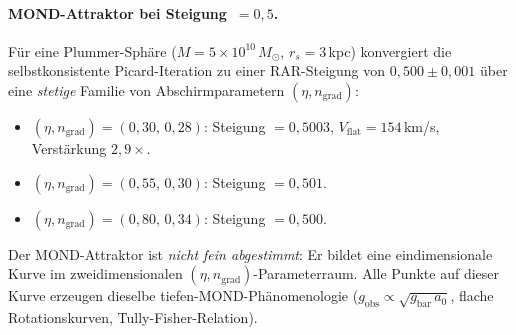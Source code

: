 \documentclass[aps,prd,twocolumn,superscriptaddress,nofootinbib]{revtex4-2}
\begin{document}
\paragraph{MOND-Attraktor bei Steigung~$=0{,}5$.}
F\"ur eine Plummer-Sph\"are ($M = 5 \times 10^{10}\,M_\odot$, $r_s = 3$\,kpc) konvergiert die selbstkonsistente Picard-Iteration zu einer RAR-Steigung von $0{,}500 \pm 0{,}001$ \"uber eine \textit{stetige} Familie von Abschirmparametern $(\eta, n_{\mathrm{grad}})$:
\begin{itemize}
\item $(\eta, n_{\mathrm{grad}}) = (0{,}30,\, 0{,}28)$: Steigung $= 0{,}5003$, $V_{\mathrm{flat}} = 154$\,km/s, Verst\"arkung $2{,}9\times$.
\item $(\eta, n_{\mathrm{grad}}) = (0{,}55,\, 0{,}30)$: Steigung $= 0{,}501$.
\item $(\eta, n_{\mathrm{grad}}) = (0{,}80,\, 0{,}34)$: Steigung $= 0{,}500$.
\end{itemize}
Der MOND-Attraktor ist \textit{nicht fein abgestimmt}: Er bildet eine eindimensionale Kurve im zweidimensionalen $(\eta, n_{\mathrm{grad}})$-Parameterraum. Alle Punkte auf dieser Kurve erzeugen dieselbe tiefen-MOND-Ph\"anomenologie ($g_{\mathrm{obs}} \propto \sqrt{g_{\mathrm{bar}}\,a_0}$, flache Rotationskurven, Tully-Fisher-Relation).
\end{document}
